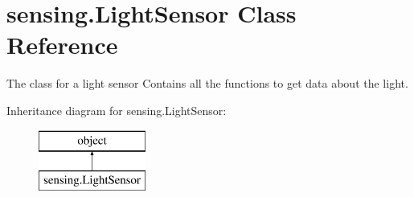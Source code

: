 \hypertarget{classsensing_1_1_light_sensor}{\section{sensing.\-Light\-Sensor Class Reference}
\label{classsensing_1_1_light_sensor}
}


The class for a light sensor Contains all the functions to get data about the light.  


Inheritance diagram for sensing.\-Light\-Sensor\-:\begin{figure}[H]
\begin{center}
\leavevmode
\includegraphics[height=2.000000cm]{classsensing_1_1_light_sensor}
\end{center}
\end{figure}
